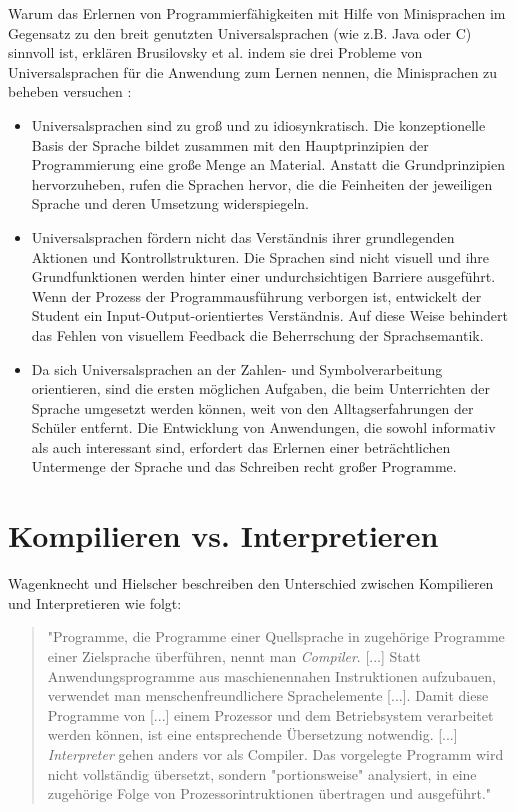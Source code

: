Warum das Erlernen von Programmierfähigkeiten mit Hilfe von Minisprachen im Gegensatz zu den breit genutzten Universalsprachen (wie z.B. Java oder C) sinnvoll ist, erklären Brusilovsky et al. indem sie drei Probleme von Universalsprachen für die Anwendung zum Lernen nennen, die Minisprachen zu beheben versuchen \cite[67]{brusilovsky1997}:

\begin{itemize}
    \item Universalsprachen sind zu groß und zu idiosynkratisch. Die konzeptionelle Basis der Sprache bildet zusammen mit den Hauptprinzipien der Programmierung eine große Menge an Material. Anstatt die Grundprinzipien hervorzuheben, rufen die Sprachen  hervor, die die Feinheiten der jeweiligen Sprache und deren Umsetzung widerspiegeln.
    \item Universalsprachen fördern nicht das Verständnis ihrer grundlegenden Aktionen und Kontrollstrukturen. Die Sprachen sind nicht visuell und ihre Grundfunktionen werden hinter einer undurchsichtigen Barriere ausgeführt. Wenn der Prozess der Programmausführung verborgen ist, entwickelt der Student ein Input-Output-orientiertes Verständnis. Auf diese Weise behindert das Fehlen von visuellem Feedback die Beherrschung der Sprachsemantik.
    \item Da sich Universalsprachen an der Zahlen- und Symbolverarbeitung orientieren, sind die ersten möglichen Aufgaben, die beim Unterrichten der Sprache umgesetzt werden können, weit von den Alltagserfahrungen der Schüler entfernt. Die Entwicklung von Anwendungen, die sowohl informativ als auch interessant sind, erfordert das Erlernen einer beträchtlichen Untermenge der Sprache und das Schreiben recht großer Programme.
\end{itemize}

\section{Kompilieren vs. Interpretieren}

Wagenknecht und Hielscher beschreiben den Unterschied zwischen Kompilieren und Interpretieren wie folgt:

\begin{quote}
    "Programme, die Programme einer Quellsprache in zugehörige Programme einer Zielsprache überführen, nennt man \emph{Compiler}. [...] Statt Anwendungsprogramme aus maschienennahen Instruktionen aufzubauen, verwendet man menschenfreundlichere Sprachelemente [...]. Damit diese Programme von [...] einem Prozessor und dem Betriebsystem verarbeitet werden können, ist eine entsprechende Übersetzung notwendig. [...] \emph{Interpreter} gehen anders vor als Compiler. Das vorgelegte Programm wird nicht vollständig übersetzt, sondern "portionsweise" analysiert, in eine zugehörige Folge von Prozessorintruktionen übertragen und ausgeführt."~\cite[47]{wagenknecht2009}
\end{quote}
